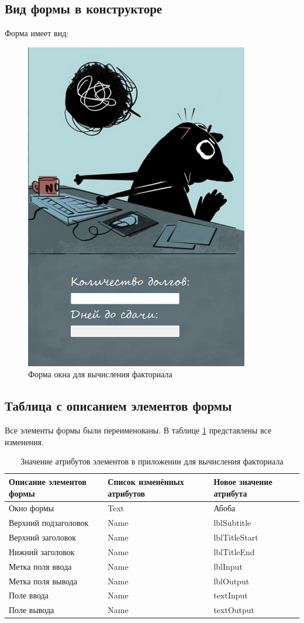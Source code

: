 \subsection{Вид формы в конструкторе}
Форма имеет вид:
\begin{figure}
  \centering
  \includegraphics[width=0.5\linewidth]{images/factorial/form.png}
  \caption{Форма окна для вычисления факториала}
  \label{fig:factorial-form}
\end{figure}

\subsection{Таблица с описанием элементов формы}
Все элементы формы были переименованы. В таблице \ref{tab:factorial-form} представлены все изменения.

\begin{table}[H]
  \centering
  \begin{tabular}{|m{}|m{}|m{}|}
    \hline
    \textbf{Описание элементов формы} & \textbf{Список изменённых атрибутов} & \textbf{Новое значение атрибута} \\
    \hline
    \hline
    Окно формы & Text & Абоба \\
    Верхний подзаголовок & Name & lblSubtitle \\
    Верхний заголовок & Name & lblTitleStart \\
    Нижний заголовок & Name & lblTitleEnd \\
    Метка поля ввода & Name & lblInput \\
    Метка поля вывода & Name & lblOutput \\
    Поле ввода & Name & textInput \\
    Поле вывода & Name & textOutput \\
    \hline
  \end{tabular}
  \caption{Значение атрибутов элементов в приложении для вычисления факториала}
  \label{tab:factorial-form}
\end{table}


